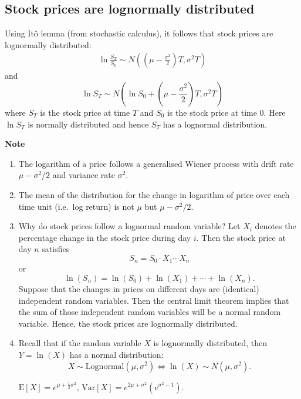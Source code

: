 \documentclass[
]{book}
\theoremstyle{definition}
\theoremstyle{definition}
\theoremstyle{definition}
\theoremstyle{definition}
\theoremstyle{remark}
\begin{document}
\hypertarget{stock-prices-are-lognormally-distributed}{%
\subsection*{Stock prices are lognormally distributed}\label{stock-prices-are-lognormally-distributed}}

Using Itô lemma (from stochastic calculus), it follows that stock prices
are lognormally distributed: \[\begin{aligned}
 \label{lognormal}
 \ln \frac{S_T}{S_0} \sim N\left((\mu - \frac{\sigma^2}{2})T,\sigma^2 T\right)
 \end{aligned}\] and
\[\ln S_T \sim N\left(\ln S_0 +  (\mu - \frac{\sigma^2}{2})T,\sigma^2 T\right)\]
where \(S_T\) is the stock price at time \(T\) and \(S_0\) is the stock price
at time 0. Here \(\ln S_T\) is normally distributed and hence \(S_T\) has a
lognormal distribution.

\textbf{Note}

\begin{enumerate}
\def\labelenumi{\arabic{enumi}.}
\item
  The logarithm of a price follows a generalised Wiener process with
  drift rate \(\mu - \sigma^2/2\) and variance rate \(\sigma^2\).
\item
  The mean of the distribution for the change in logarithm of price
  over each time unit (i.e.~log return) is not \(\mu\) but
  \(\mu - \sigma^2/2\).
\item
  Why do stock prices follow a lognormal random variable? Let \(X_i\)
  denotes the percentage change in the stock price during day \(i\).
  Then the stock price at day \(n\) satisfies
  \[S_n = S_0 \cdot X_1 \cdots X_n\] or
  \[\ln(S_n) = \ln(S_0) + \ln(X_1) + \cdots + \ln(X_n).\] Suppose that
  the changes in prices on different days are (identical) independent
  random variables. Then the central limit theorem implies that the
  sum of those independent random variables will be a normal random
  variable. Hence, the stock prices are lognormally distributed.
\item
  Recall that if the random variable \(X\) is lognormally distributed,
  then \(Y = \ln(X)\) has a normal distribution:
  \[X \sim \text{Lognormal}(\mu,\sigma^2)  \Longleftrightarrow \ln(X) \sim N(\mu,\sigma^2).\]

  \(\mathrm{E}[X] = e^{\mu + \frac{1}{2}\sigma^2}, \, \mathrm{Var}[X] = e^{2\mu + \sigma^2}\left( e^{\sigma^2 - 1} \right).\)
\end{enumerate}
\end{document}
